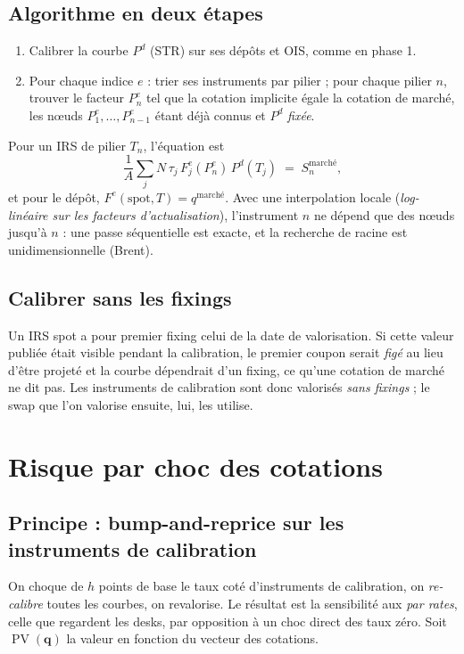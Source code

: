 \documentclass[11pt,a4paper]{article}
\newcommand{\estr}{\texorpdfstring{\texteuro STR}{EUR STR}}
\DeclareMathOperator{\PV}{PV}
\theoremstyle{plain}
\theoremstyle{definition}
\theoremstyle{remark}
\begin{document}
\subsection{Algorithme en deux étapes}
\begin{enumerate}
  \item Calibrer la courbe \(P^d\) (\estr{}) sur ses dépôts et OIS, comme en phase 1.
  \item Pour chaque indice \(e\) : trier ses instruments par pilier ; pour chaque pilier \(n\),
    trouver le facteur \(P^e_n\) tel que la cotation implicite égale la cotation de marché, les nœuds
    \(P^e_1,\dots,P^e_{n-1}\) étant déjà connus et \(P^d\) \emph{fixée}.
\end{enumerate}
Pour un IRS de pilier \(T_n\), l'équation est
\begin{equation}
  \frac{1}{A}\sum_{j} N\,\tau_j\,F^e_j(P^e_n)\,P^d(T_j) \;=\; S^{\mathrm{marché}}_n,
  \label{eq:calib-swap}
\end{equation}
et pour le dépôt, \(F^e(\mathrm{spot},T)=q^{\mathrm{marché}}\). Avec une interpolation locale
(\emph{log-linéaire sur les facteurs d'actualisation}), l'instrument \(n\) ne dépend que des nœuds
jusqu'à \(n\) : une passe séquentielle est exacte, et la recherche de racine est unidimensionnelle
(Brent).

\subsection{Calibrer sans les fixings}\label{sec:nofixing}
Un IRS spot a pour premier fixing celui de la date de valorisation. Si cette valeur publiée était
visible pendant la calibration, le premier coupon serait \emph{figé} au lieu d'être projeté et la
courbe dépendrait d'un fixing, ce qu'une cotation de marché ne dit pas. Les instruments de calibration
sont donc valorisés \emph{sans fixings} ; le swap que l'on valorise ensuite, lui, les utilise.

\section{Risque par choc des cotations}\label{sec:risk}

\subsection{Principe : bump-and-reprice sur les instruments de calibration}
On choque de \(h\) points de base le taux coté d'instruments de calibration, on \emph{re-calibre}
toutes les courbes, on revalorise. Le résultat est la sensibilité aux \emph{par rates}, celle que
regardent les desks, par opposition à un choc direct des taux zéro. Soit \(\PV(\mathbf q)\) la valeur
en fonction du vecteur des cotations.
\end{document}
